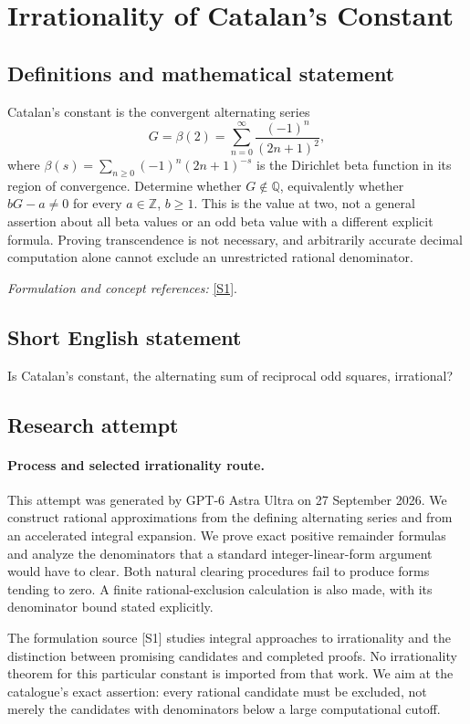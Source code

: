 \documentclass[11pt]{article}
\begin{document}
\section*{\texorpdfstring{Irrationality of Catalan's Constant}{Irrationality of Catalan's Constant}}\label{413}
\subsection{Definitions and mathematical statement}
Catalan's constant is the convergent alternating series
\[
 G=\beta(2)=\sum_{n=0}^{\infty}\frac{(-1)^n}{(2n+1)^2},
\]
where $\beta(s)=\sum_{n\ge0}(-1)^n(2n+1)^{-s}$ is the Dirichlet beta function in its region of convergence. Determine whether $G\notin{\mathbb{Q}}$, equivalently whether $bG-a\ne0$ for every $a\in{\mathbb{Z}}$, $b\ge1$. This is the value at two, not a general assertion about all beta values or an odd beta value with a different explicit formula. Proving transcendence is not necessary, and arbitrarily accurate decimal computation alone cannot exclude an unrestricted rational denominator.
\par\smallskip\textit{Formulation and concept references:} \href{https://arxiv.org/abs/2101.08308}{[S1]}.

\subsection{Short English statement}
Is Catalan's constant, the alternating sum of reciprocal odd squares, irrational?
\subsection{Research attempt}
\paragraph{Process and selected irrationality route.}
This attempt was generated by GPT-6 Astra Ultra on 27 September 2026. We construct rational approximations from the defining alternating series and from an accelerated integral expansion. We prove exact positive remainder formulas and analyze the denominators that a standard integer-linear-form argument would have to clear. Both natural clearing procedures fail to produce forms tending to zero. A finite rational-exclusion calculation is also made, with its denominator bound stated explicitly.

The formulation source [S1] studies integral approaches to irrationality and the distinction between promising candidates and completed proofs. No irrationality theorem for this particular constant is imported from that work. We aim at the catalogue's exact assertion: every rational candidate must be excluded, not merely the candidates with denominators below a large computational cutoff.
\end{document}
